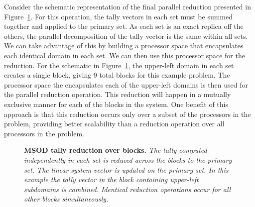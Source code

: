 Consider the schematic representation of the final parallel reduction
presented in Figure~\ref{fig:msod_tally_reduction}. For this
operation, the tally vectors in each set must be summed together and
applied to the primary set. As each set is an exact replica off the
others, the parallel decomposition of the tally vector is the same
within all sets. We can take advantage of this by building a processor
space that encapsulates each identical domain in each set. We can then
use this processor space for the reduction. For the schematic in
Figure~\ref{fig:msod_tally_reduction}, the upper-left domain in each
set creates a single block, giving 9 total blocks for this example
problem. The processor space the encapsulates each of the upper-left
domains is then used for the parallel reduction operation. This
reduction will happen in a mutually exclusive manner for each of the
blocks in the system. One benefit of this approach is that this
reduction occurs only over a subset of the processors in the problem,
providing better scalability than a reduction operation over all
processors in the problem.

\begin{figure}[t!]
  \begin{center}
    \scalebox{0.6}{  }
  \end{center}
  \caption{\textbf{MSOD tally reduction over blocks.} \textit{The
      tally computed independently in each set is reduced across the
      blocks to the primary set. The linear system vector is updated
      on the primary set. In this example the tally vector in the
      block containing upper-left subdomains is combined. Identical
      reduction operations occur for all other blocks
      simultaneously.}}
  \label{fig:msod_tally_reduction}
\end{figure}

\clearpage

